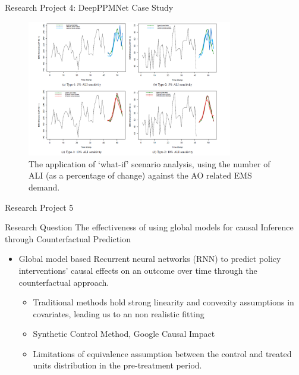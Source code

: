 \documentclass{beamer}
\begin{document}
\begin{frame}{Research Project 4: DeepPPMNet Case Study}
\begin{figure}[htbp]
\centerline{\includegraphics[width=0.80\textwidth]{images/whatif}}
\caption{ \scriptsize The application of `what-if' scenario analysis, using the number of  ALI (as a percentage of change) against the AO related EMS demand.}
\label{whatif}
\end{figure}
\end{frame}

\begin{frame}{Research Project 5 }
   \begin{block}{Research Question}	
	The effectiveness of using global models for causal Inference through Counterfactual Prediction
	\end{block}
	\begin{itemize}
	\item Global model based Recurrent neural networks (RNN) to predict policy interventions’ causal effects on an outcome over time through the counterfactual approach.
		\begin{itemize}
		\item \color{blue} Traditional methods hold strong linearity and convexity assumptions in covariates, leading us to an non realistic fitting
		\item \color{blue}  Synthetic Control Method, Google Causal Impact
		\item \color{blue} Limitations of equivalence assumption between the control and treated units distribution in the pre-treatment period.
		\end{itemize}
 \end{itemize}
\end{frame}
\end{document}
